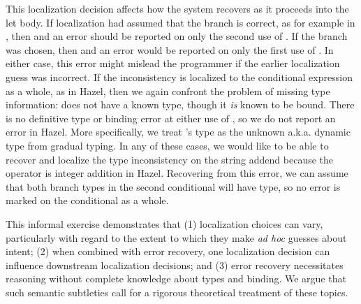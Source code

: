 This localization decision affects how the system recovers as it proceeds into the let body. 
If localization had assumed that the  branch is correct, as for example in , then 
 and an error should be reported on only the second use of . 
If the  branch was chosen, then  and an error would be reported on only the first use of . 
 In either case, this error might mislead the programmer if the earlier localization guess was incorrect.
If the inconsistency is localized to the conditional expression as a whole, as in Hazel, then we again confront the problem of missing type information: 
 does not have a known type,
though it \emph{is} known to be bound. 
There is no definitive type or binding error at either use of , 
so we do not report an error in Hazel. More specifically, we treat 's type as the unknown a.k.a. dynamic type from gradual typing.
In any of these cases, we would like to be able to recover and 
localize the type inconsistency on the string addend because the \li{+} operator is integer addition in Hazel.
Recovering from this error, we can assume that both branch types in the second conditional will have  type, so no 
error is marked on the conditional as a whole.

This informal exercise demonstrates that (1) localization choices can vary, particularly with regard to the extent to which they make \emph{ad hoc} guesses about intent;  
(2) when combined with error recovery, one localization decision can influence downstream localization decisions; and 
(3) error recovery necessitates reasoning without complete knowledge about types and binding. We argue that such semantic subtleties call for a rigorous theoretical treatment of these topics.


